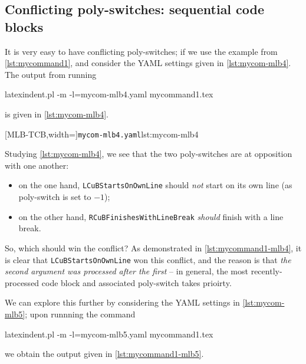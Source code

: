 \subsection{Conflicting poly-switches: sequential code blocks}
It is very easy to have conflicting poly-switches; if we use the example from \vref{lst:mycommand1}, 
and consider the YAML settings given in \cref{lst:mycom-mlb4}. The output from running
\begin{commandshell}
latexindent.pl -m -l=mycom-mlb4.yaml mycommand1.tex
\end{commandshell}
is given in \cref{lst:mycom-mlb4}.

	\begin{minipage}{.4\linewidth}
	\end{minipage}
    \hfill
	\begin{minipage}{.55\linewidth}
		[MLB-TCB,width=\linewidth]{\texttt{mycom-mlb4.yaml}}{lst:mycom-mlb4}
	\end{minipage}

    Studying \cref{lst:mycom-mlb4}, we see that the two poly-switches are at opposition with one another:
    \begin{itemize}
      \item on the one hand, \texttt{LCuBStartsOnOwnLine} should \emph{not} start on its own line (as poly-switch is set to $-1$);
      \item on the other hand, \texttt{RCuBFinishesWithLineBreak} \emph{should} finish with a line break.
    \end{itemize}
    So, which should win the conflict? As demonstrated in \cref{lst:mycommand1-mlb4}, it is clear that \texttt{LCuBStartsOnOwnLine} won 
    this conflict, and the reason is that \emph{the second argument was processed after the first} -- in general, the most recently-processed
    code block and associated poly-switch takes prioirty.

    We can explore this further by considering the YAML settings in \cref{lst:mycom-mlb5}; upon runnning the command
\begin{commandshell}
latexindent.pl -m -l=mycom-mlb5.yaml mycommand1.tex
\end{commandshell}
    we obtain the output given in \cref{lst:mycommand1-mlb5}.


